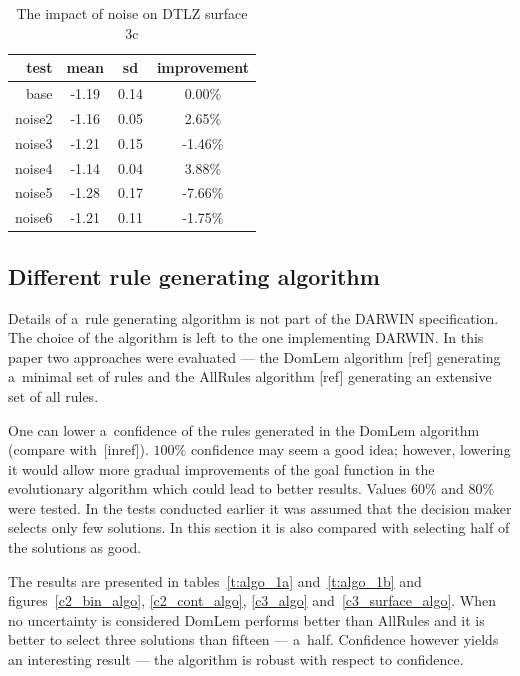 \begin{table}[h]
  \centering
  \begin{tabular}{r c c c}
    \hline
    test & mean & sd & improvement  \\
    \hline
    \hline
    base & -1.19 & 0.14 & 0.00\%     \\
    noise2 & -1.16 & 0.05 & 2.65\%   \\
    noise3 & -1.21 & 0.15 & -1.46\%  \\
    noise4 & -1.14 & 0.04 & 3.88\%   \\
    noise5 & -1.28 & 0.17 & -7.66\%  \\
    noise6 & -1.21 & 0.11 & -1.75\%  \\
    \hline
  \end{tabular}
  \caption{The impact of noise on DTLZ surface 3c}
  \label{t:noise3}
\end{table}
\clearpage{}

\subsection{Different rule generating algorithm}
Details of a~rule generating algorithm is not part of the DARWIN
specification. The choice of the algorithm is left to the one implementing
DARWIN. In this paper two approaches were evaluated --- the DomLem algorithm
[ref] generating a~minimal set of rules and the AllRules algorithm [ref]
generating an extensive set of all rules.

One can lower a~confidence of the rules generated in the DomLem algorithm
(compare with~[inref]). $100\%$ confidence may seem a good idea; however,
lowering it would allow more gradual improvements of the goal function in the
evolutionary algorithm which could lead to better results. Values $60\%$ and
$80\%$ were tested. In the tests conducted earlier it was assumed that the
decision maker selects only few solutions. In this section it is also compared
with selecting half of the solutions as good.

The results are presented in tables~\ref{t:algo_1a} and~\ref{t:algo_1b} and
figures~\ref{c2_bin_algo}, \ref{c2_cont_algo}, \ref{c3_algo}
and~\ref{c3_surface_algo}. When no uncertainty is considered DomLem performs
better than AllRules and it is better to select three solutions than fifteen
--- a~half. Confidence however yields an interesting result --- the algorithm
is robust with respect to confidence.

